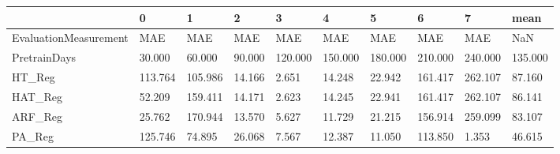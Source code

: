 \begin{tabular}{llllllllll}
\toprule
{} &       0 &       1 &      2 &       3 &       4 &       5 &       6 &       7 &    mean \\
\midrule
EvaluationMeasurement &     MAE &     MAE &    MAE &     MAE &     MAE &     MAE &     MAE &     MAE &     NaN \\
PretrainDays          &  30.000 &  60.000 & 90.000 & 120.000 & 150.000 & 180.000 & 210.000 & 240.000 & 135.000 \\
HT\_Reg                & 113.764 & 105.986 & 14.166 &   2.651 &  14.248 &  22.942 & 161.417 & 262.107 &  87.160 \\
HAT\_Reg               &  52.209 & 159.411 & 14.171 &   2.623 &  14.245 &  22.941 & 161.417 & 262.107 &  86.141 \\
ARF\_Reg               &  25.762 & 170.944 & 13.570 &   5.627 &  11.729 &  21.215 & 156.914 & 259.099 &  83.107 \\
PA\_Reg                & 125.746 &  74.895 & 26.068 &   7.567 &  12.387 &  11.050 & 113.850 &   1.353 &  46.615 \\
\bottomrule
\end{tabular}
